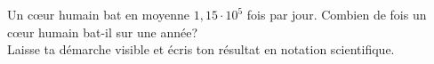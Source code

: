 %
%
    Un c\oe ur humain bat en moyenne $ 1,15 \cdot 10^5$ fois par jour. Combien de fois un cœur humain bat-il sur une année? \\
    Laisse ta démarche visible et écris ton résultat en notation scientifique.
